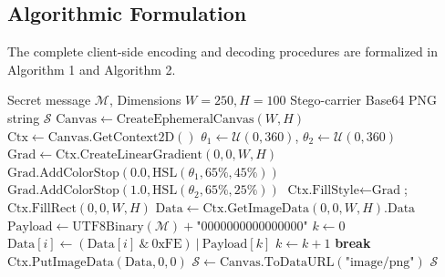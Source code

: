 \documentclass[conference]{IEEEtran}
\begin{document}
\subsection{Algorithmic Formulation}
The complete client-side encoding and decoding procedures are formalized in Algorithm 1 and Algorithm 2.

\begin{algorithm}
\caption{Procedural Steganographic Carrier Encoding}
\begin{algorithmic}[1]
\REQUIRE Secret message $\mathcal{M}$, Dimensions $W = 250, H = 100$
\ENSURE Stego-carrier Base64 PNG string $\mathcal{S}$
\STATE $\text{Canvas} \leftarrow \text{CreateEphemeralCanvas}(W, H)$
\STATE $\text{Ctx} \leftarrow \text{Canvas.GetContext2D}()$
\STATE $\theta_1 \leftarrow \mathcal{U}(0, 360)$, $\theta_2 \leftarrow \mathcal{U}(0, 360)$
\STATE $\text{Grad} \leftarrow \text{Ctx.CreateLinearGradient}(0, 0, W, H)$
\STATE $\text{Grad.AddColorStop}(0.0, \text{HSL}(\theta_1, 65\%, 45\%))$
\STATE $\text{Grad.AddColorStop}(1.0, \text{HSL}(\theta_2, 65\%, 25\%))$
\STATE $\text{Ctx.FillStyle} \leftarrow \text{Grad}$; $\text{Ctx.FillRect}(0, 0, W, H)$
\STATE $\text{Data} \leftarrow \text{Ctx.GetImageData}(0, 0, W, H).\text{Data}$
\STATE $\text{Payload} \leftarrow \text{UTF8Binary}(\mathcal{M}) + \text{"0000000000000000"}$
\STATE $k \leftarrow 0$
            \STATE $\text{Data}[i] \leftarrow (\text{Data}[i] \ \& \ 0\text{xFE}) \ | \ \text{Payload}[k]$
            \STATE $k \leftarrow k + 1$
        \ELSE
            \STATE \textbf{break}
        \ENDIF
    \ENDIF
\ENDFOR
\STATE $\text{Ctx.PutImageData}(\text{Data}, 0, 0)$
\STATE $\mathcal{S} \leftarrow \text{Canvas.ToDataURL}(\text{"image/png"})$
\RETURN $\mathcal{S}$
\end{algorithmic}
\end{algorithm}
\end{document}
